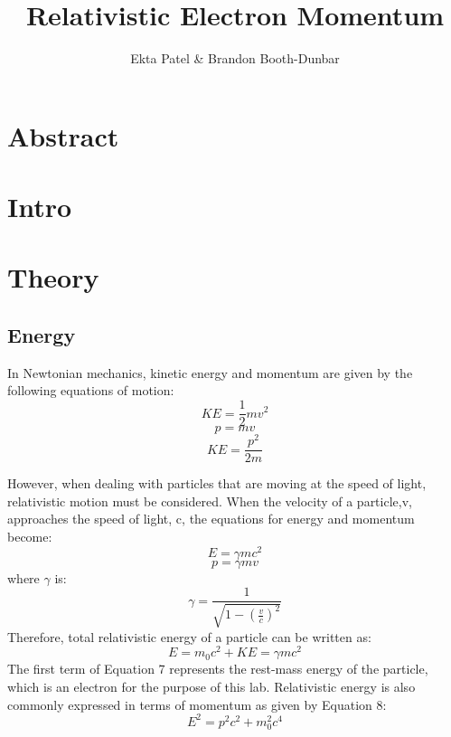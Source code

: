 


\newcommand{\ig}[2][width=4in]{\texttt{[image: \#2]}}    		
\usepackage{graphicx}					
\usepackage{amssymb}
\usepackage{pgfplotstable}
\usepackage{float}
\usepackage{caption}
\captionsetup[table]{justification=justified,singlelinecheck=false, position=bottom}


\header {\today}							
\title{Relativistic Electron Momentum}
\author{Ekta Patel \& Brandon Booth-Dunbar}



\section{Abstract}
\begin{em}
\end{em}

\section{Intro}

\section{Theory}

\subsection{Energy}
In Newtonian mechanics, kinetic energy and momentum are given by the following equations of motion:
\begin{equation}KE= \frac{1}{2}mv^2 \end{equation}
\begin{equation} p=mv \end{equation}
\begin {equation}KE=\frac{p^2}{2m} \end{equation}

However, when dealing with particles that are moving at the speed of light, relativistic motion must be considered. When the velocity of a particle,v, approaches the speed of light, c, the equations for energy and momentum become:
\begin{equation} E=\gamma mc^2\end{equation}
\begin{equation} p=\gamma mv\end{equation}
where $\gamma$ is:
\begin{equation} \gamma= \frac{1}{\sqrt{1-(\frac{v}{c})^2}}\end{equation}
Therefore, total relativistic energy of a particle can be written as:
\begin{equation} E=m_0c^2+KE=\gamma mc^2\end{equation}
The first term of Equation 7 represents the rest-mass energy of the particle, which is an electron for the purpose of this lab. Relativistic energy is also commonly expressed in terms of momentum as given by Equation 8:
\begin{equation}E^2=p^2c^2+m_0^2c^4\end{equation}
